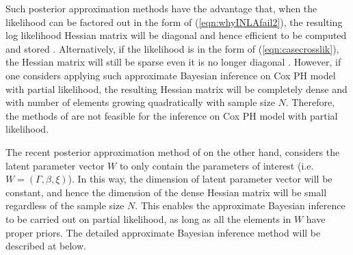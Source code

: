 \documentclass[ba]{imsart}
\begin{document}
Such posterior approximation methods have the advantage that, when the likelihood can be factored out in the form of (\ref{eqn:whyINLAfail2}), the resulting log likelihood Hessian matrix will be diagonal and hence efficient to be computed and stored \citep{inla}. Alternatively, if the likelihood is in the form of (\ref{eqn:casecrosslik}), the Hessian matrix will still be sparse even it is no longer diagonal \citep{casecross}. However, if one considers applying such approximate Bayesian inference on Cox PH model with partial likelihood, the resulting Hessian matrix will be completely dense and with number of elements growing quadratically with sample size $N$. Therefore, the methods of \cite{inla,inlacoxph,casecross} are not feasible for the inference on Cox PH model with partial likelihood. 

The recent posterior approximation method of \cite{ELGM} on the other hand, considers the latent parameter vector $W$ to only contain the parameters of interest (i.e. $W = \left(\Gamma,\beta, \xi \right)$). In this way, the dimension of latent parameter vector will be constant, and hence the dimension of the dense Hessian matrix will be small regardless of the sample size $N$. This enables the approximate Bayesian inference to be carried out on partial likelihood, as long as all the elements in $W$ have proper priors. The detailed approximate Bayesian inference method will be described at below.
\end{document}
